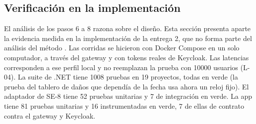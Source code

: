 \documentclass[11pt,letterpaper]{article}
\begin{document}
\subsection{Verificación en la implementación}
\label{sec:verificacion}

El análisis de los pasos 6 a 8 razona sobre el diseño. Esta sección presenta aparte la evidencia
medida en la implementación de la entrega 2, que no forma parte del análisis del método
\cite{revision}. Las corridas se hicieron con Docker Compose en un solo computador, a través del
gateway y con tokens reales de Keycloak. Las latencias corresponden a ese perfil local y no
reemplazan la prueba con \num{10000} usuarios (L-04). La suite de .NET tiene \num{1008} pruebas en
19 proyectos, todas en verde (la prueba del tablero de daños que dependía de la fecha usa ahora un
reloj fijo). El adaptador de SE-8 tiene 52 pruebas unitarias y 7 de integración en verde. La app tiene 81 pruebas unitarias y 16 instrumentadas en verde, 7 de
ellas de contrato contra el gateway y Keycloak.
\end{document}
